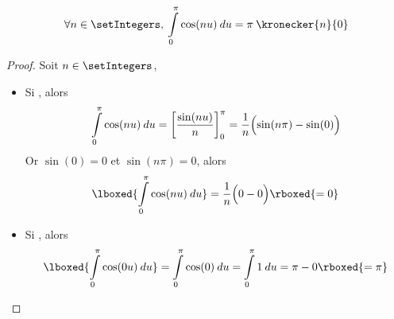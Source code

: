 \begin{lemma}
\[
\forall n \in \setIntegers, \:\displaystyle\int\limits_{0}^{\pi} \cos(nu) \:du = \pi\: \kronecker{n}{0}
\]
\end{lemma}
\begin{proof}
Soit $n \in \setIntegers$, 
\begin{itemize}
\item Si , alors
\[
\displaystyle\int\limits_{0}^{\pi} \cos(nu)  \: du = \left[\dfrac{\sin(nu)}{n}\right]_{0}^{\pi}= \dfrac{1}{n}\Bigl(\sin(n\pi) - \sin(0)\Bigr)
\]
Or $\sin(0) = 0$ et $\sin(n\pi) = 0$, alors 
\[
\lboxed{\displaystyle\int\limits_{0}^{\pi} \cos(nu) \: du} = \dfrac{1}{n}\Bigl(0 - 0\Bigr) \rboxed{= 0}
\]
\item Si , alors 
\[
\lboxed{\displaystyle\int\limits_{0}^{\pi} \cos(0u) \: du} 
= \displaystyle\int\limits_{0}^{\pi} \cos(0) \: du 
= \displaystyle\int\limits_{0}^{\pi} 1 \: du
= \pi - 0 
\rboxed{= \pi}
\]
\end{itemize}
\end{proof}